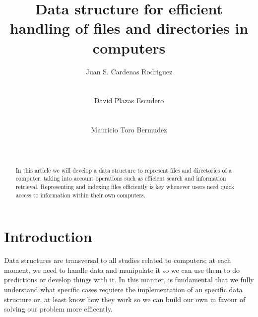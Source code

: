 \documentclass{sig-alternate-05-2015}
\begin{document}







  \title{Data structure for efficient handling of files and directories in computers}


  \author{
    \alignauthor
    Juan S. Cardenas Rodriguez\\
           \\
           \\
    \alignauthor
    David Plazas Escudero\\
           \\
           \\
    \alignauthor
    Mauricio Toro Bermudez\\
           \\
           \\
  }

  \maketitle

  \begin{abstract}
    In this article we will develop a data structure to represent files and directories of a computer,
    taking into account operations such as efficient search and information retrieval. Representing and
    indexing files efficiently is key whenever users need quick access to information within
    their own computers.
  \end{abstract}


  \section{Introduction}
    Data structures are transversal to all studies related to computers; at each moment, we need to handle
    data and manipulate it so we can use them to do predictions or develop things with it. In this manner, is fundamental
    that we fully understand what specific cases requiere the implementation of an specific data structure or,
    at least know how they work so we can build our own in favour of solving our problem more efficently.
\end{document}
